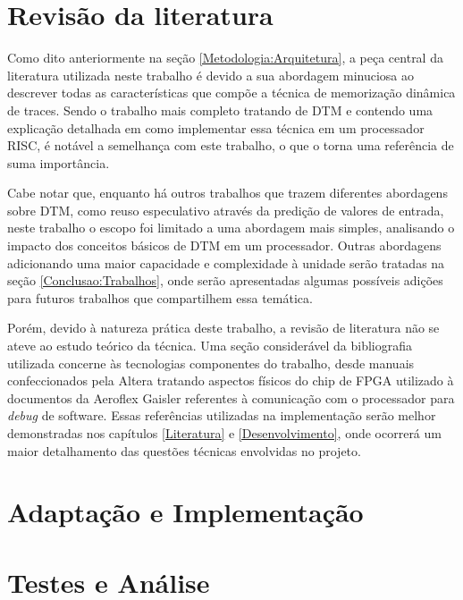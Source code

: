 \section{Revisão da literatura}
\label{Metodologia:Literatura}

Como dito anteriormente na seção \ref{Metodologia:Arquitetura}, a peça central da literatura utilizada neste trabalho é \cite{costa2001explorando} devido a sua abordagem minuciosa ao descrever todas as características que compõe a técnica de memorização dinâmica de traces. Sendo o trabalho mais completo tratando de DTM e contendo uma explicação detalhada em como implementar essa técnica em um processador RISC, é notável a semelhança com este trabalho, o que o torna uma referência de suma importância.

Cabe notar que, enquanto há outros trabalhos que trazem diferentes abordagens sobre DTM, como reuso especulativo através da predição de valores de entrada, neste trabalho o escopo foi limitado a uma abordagem mais simples, analisando o impacto dos conceitos básicos de DTM em um processador. Outras abordagens adicionando uma maior capacidade e complexidade à unidade serão tratadas na seção \ref{Conclusao:Trabalhos}, onde serão apresentadas algumas possíveis adições para futuros trabalhos que compartilhem essa temática.



Porém, devido à natureza prática deste trabalho, a revisão de literatura não se ateve ao estudo teórico da técnica. Uma seção considerável da bibliografia utilizada concerne às tecnologias componentes do trabalho, desde manuais confeccionados pela Altera tratando aspectos físicos do chip de FPGA utilizado à documentos da Aeroflex Gaisler referentes à comunicação com o processador para \textit{debug} de software. Essas referências utilizadas na implementação serão melhor demonstradas nos capítulos \ref{Literatura} e \ref{Desenvolvimento}, onde ocorrerá um maior detalhamento das questões técnicas envolvidas no projeto.


\section{Adaptação e Implementação}
\label{Metodologia:Implementacao}


\section{Testes e Análise}
\label{Metodologia:Analise}

